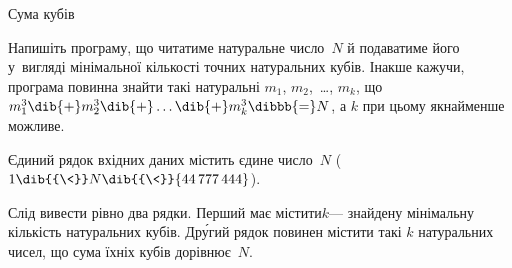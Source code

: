 \begin{problemAllDefault}{Сума кубів}

Напишіть програму, що читатиме натуральне число~$N$ й подаватиме його у~вигляді мінімальної кількості точних натуральних кубів. Інакше кажучи, програма повинна знайти такі натуральні $m_1$, $m_2$,~\dots, $m_k$, що 
$m_1^3\dib{{+}}m_2^3\dib{{+}}\dots\dib{{+}}m_k^3\dibbb{{=}}N$, а $k$ при цьому якнайменше можливе.


\InputFile
Єдиний рядок вхідних даних містить єдине число~$N$ ($1\dib{{\<}}N\dib{{\<}}{44\,777\,444}$).

\OutputFile
Слід вивести рівно два рядки. Перший має містити\nolinebreak[3] $k$\nolinebreak[3] --- знайдену мінімальну кількість натуральних кубів. Др\'{у}гий рядок повинен містити такі $k$ натуральних чисел, що сума їхніх кубів дорівнює~$N$.

\end{problemAllDefault}